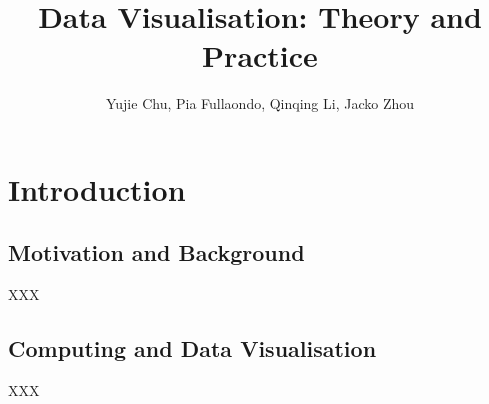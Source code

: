 \documentclass{article}\usepackage[]{graphicx}\usepackage[]{xcolor}
\title{Data Visualisation: Theory and Practice}
\author{Yujie Chu, Pia Fullaondo, Qinqing Li, Jacko Zhou}
\begin{document}
\maketitle 
\tableofcontents
\newpage 

\section{Introduction}

\subsection{Motivation and Background}
XXX

\subsection{Computing and Data Visualisation}
XXX
\end{document}
